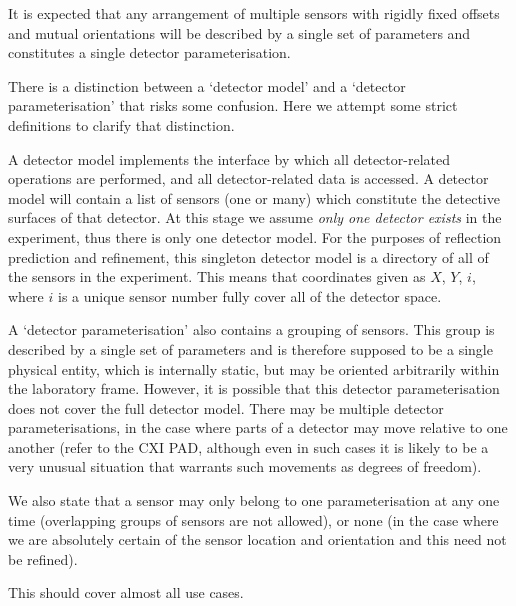 \documentclass[a4paper, 11pt]{article}
\begin{document}
It is expected that any arrangement of multiple sensors with rigidly fixed offsets and mutual
orientations will be described by a single set of parameters and constitutes a single detector parameterisation.

There is a distinction between a `detector model' and a `detector parameterisation'
that risks some confusion. Here we attempt some strict definitions to clarify 
that distinction.

A detector model implements the interface by which all detector-related operations are
performed, and all detector-related data is accessed. A detector model will contain a
list of sensors (one or many) which constitute the detective surfaces of that detector.
At this stage we assume \emph{only one detector exists} in the experiment, thus there
is only one detector model. For the purposes of reflection prediction and refinement,
this singleton detector model is a directory of all of the sensors in the experiment.
This means that coordinates given as $X$, $Y$, $i$, where $i$ is a unique sensor number
fully cover all of the detector space.

A `detector parameterisation' also contains a grouping of sensors. This group is described by a single
set of parameters and is therefore supposed to be a single physical entity, which is internally
static, but may be oriented arbitrarily within the laboratory frame. However, it is possible
that this detector parameterisation does not cover the full detector model. There may be
multiple detector parameterisations, in the case where parts of a detector may move relative
to one another (refer to the CXI PAD, although even in such cases it is likely to be a very unusual situation that warrants such
movements as degrees of freedom).

We also state that a sensor may only belong to one
parameterisation at any one time (overlapping groups of sensors are not allowed), or none
(in the case where we are absolutely certain of the sensor location and orientation and this
need not be refined).

This should cover almost all use cases.



\end{document}
